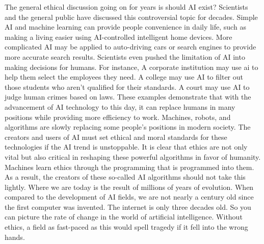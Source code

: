 \documentclass[10pt,twocolumn]{article}
\begin{document}
	The general ethical discussion going on for years is should AI exist? Scientists and the general public have discussed this controversial topic for decades. Simple AI and machine learning can provide people convenience in daily life, such as making a living easier using AI-controlled intelligent home devices. More complicated AI may be applied to auto-driving cars or search engines to provide more accurate search results. Scientists even pushed the limitation of AI into making decisions for humans. For instance, A corporate institution may use ai to help them select the employees they need. A college may use AI to filter out those students who aren't qualified for their standards. A court may use AI to judge human crimes based on laws. These examples demonstrate that with the advancement of AI technology to this day, it can replace humans in many positions while providing more efficiency to work. Machines, robots, and algorithms are slowly replacing some people's positions in modern society. The creators and users of AI must set ethical and moral standards for these technologies if the AI trend is unstoppable\cite{EthicalIssue}. It is clear that ethics are not only vital but also critical in reshaping these powerful algorithms in favor of humanity. Machines learn ethics through the programming that is programmed into them. As a result, the creators of these so-called AI algorithms should not take this lightly. Where we are today is the result of millions of years of evolution. When compared to the development of AI fields, we are not nearly a century old since the first computer was invented. The internet is only three decades old. So you can picture the rate of change in the world of artificial intelligence. Without ethics, a field as fast-paced as this would spell tragedy if it fell into the wrong hands\cite{BillGates}.
\end{document}
